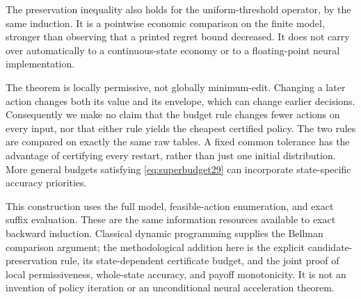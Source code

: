 The preservation inequality also holds for the uniform-threshold operator, by the same induction. It is a pointwise economic comparison on the finite model, stronger than observing that a printed regret bound decreased. It does not carry over automatically to a continuous-state economy or to a floating-point neural implementation.

The theorem is locally permissive, not globally minimum-edit. Changing a later action changes both its value and its envelope, which can change earlier decisions. Consequently we make no claim that the budget rule changes fewer actions on every input, nor that either rule yields the cheapest certified policy. The two rules are compared on exactly the same raw tables. A fixed common tolerance has the advantage of certifying every restart, rather than just one initial distribution. More general budgets satisfying \eqref{eq:superbudget29} can incorporate state-specific accuracy priorities.

This construction uses the full model, feasible-action enumeration, and exact suffix evaluation. These are the same information resources available to exact backward induction. Classical dynamic programming supplies the Bellman comparison argument; the methodological addition here is the explicit candidate-preservation rule, its state-dependent certificate budget, and the joint proof of local permissiveness, whole-state accuracy, and payoff monotonicity. It is not an invention of policy iteration or an unconditional neural acceleration theorem.
